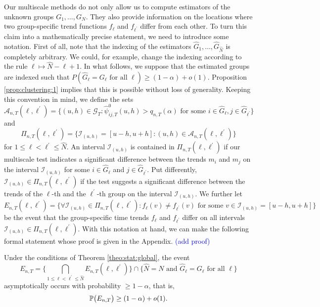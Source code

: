 \documentclass[a4paper,12pt]{article}
\begin{document}
Our multiscale methods do not only allow us to compute estimators of the unknown groups $G_1,\ldots,G_N$. They also provide information on the locations where two group-specific trend functions $f_\ell$ and $f_{\ell^\prime}$ differ from each other. To turn this claim into a mathematically precise statement, we need to introduce some notation. First of all, note that the indexing of the estimators $\widehat{G}_1,\ldots,\widehat{G}_{\widehat{N}}$ is completely arbitrary. We could, for example, change the indexing according to the rule $\ell \mapsto \widehat{N} - \ell + 1$. In what follows, we suppose that the estimated groups are indexed such that $P( \widehat{G}_\ell = G_\ell \text{ for all } \ell ) \ge (1-\alpha) + o(1)$. Proposition \ref{prop:clustering:1} implies that this is possible without loss of generality. Keeping this convention in mind, we define the sets 
{\color{red}\[ \mathcal{A}_{n,T}(\ell,\ell^\prime) = \Big\{ (u,h) \in \mathcal{G}_T: \widehat{\psi}^0_{ij,T}(u,h) > q_{n,T}(\alpha) \text{ for some } i \in \widehat{G}_\ell, j \in \widehat{G}_{\ell^\prime} \Big\} \] }
and  
\[ \Pi_{n,T}(\ell,\ell^\prime) = \big\{ \mathcal{I}_{(u,h)} = [u-h,u+h]: (u,h) \in \mathcal{A}_{n,T}(\ell,\ell^\prime) \big\} \]
for $1 \le \ell < \ell^\prime \le \widehat{N}$. An interval $\mathcal{I}_{(u,h)}$ is contained in $\Pi_{n,T}(\ell,\ell^\prime)$ if our multiscale test indicates a significant difference between the trends $m_i$ and $m_j$ on the interval $\mathcal{I}_{(u,h)}$ for some $i \in \widehat{G}_\ell$ and $j \in \widehat{G}_{\ell^\prime}$. Put differently, $\mathcal{I}_{(u,h)} \in \Pi_{n,T}(\ell,\ell^\prime)$ if the test suggests a significant difference between the trends of the $\ell$-th and the $\ell^\prime$-th group on the interval $\mathcal{I}_{(u,h)}$. We further let
\[ E_{n,T}(\ell,\ell^\prime) = \Big\{ \forall \mathcal{I}_{(u,h)} \in \Pi_{n,T}(\ell,\ell^\prime): f_\ell(v) \ne f_{\ell^\prime}(v) \text{ for some } v \in \mathcal{I}_{(u,h)} = [u-h,u+h] \Big\} \]
be the event that the group-specific time trends $f_\ell$ and $f_{\ell^\prime}$ differ on all intervals $\mathcal{I}_{(u,h)} \in \Pi_{n,T}(\ell,\ell^\prime)$. With this notation at hand, we can make the following formal statement whose proof is given in the Appendix. \textcolor{blue}{(add proof)} 
\begin{prop}\label{prop:clustering:2}
Under the conditions of Theorem \ref{theo:stat:global}, the event 
\[ E_{n,T} = \Big\{ \bigcap_{1 \le \ell < \ell^\prime \le \widehat{N}} E_{n,T}(\ell,\ell^\prime) \Big\} \cap \Big\{ \widehat{N} = N \text{ and } \widehat{G}_\ell = G_\ell \text{ for all } \ell \Big\} \]
asymptotically occurs with probability $\ge 1-\alpha$, that is, 
\[ \mathbb{P} \big( E_{n,T} \big) \ge (1 - \alpha) + o(1). \]
\end{prop}
\end{document}

